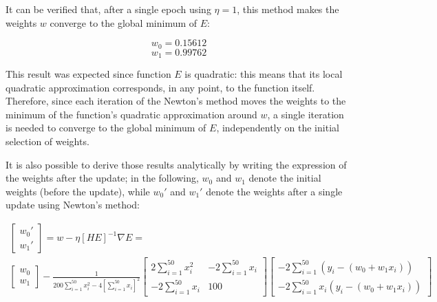 \documentclass[letterpaper,headings=standardclasses]{scrartcl}
\begin{document}
It can be verified that, after a single epoch using $\eta = 1$, this method makes the weights $w$ converge to the global minimum of $E$:

$$ w_0 = 0.15612 $$
$$ w_1 = 0.99762 $$

This result was expected since function $E$ is quadratic: this means that its local quadratic approximation corresponds, in any point, to the function itself. Therefore, since each iteration of the Newton's method moves the weights to the minimum of the function's quadratic approximation around $w$, a single iteration is needed to converge to the global minimum of $E$, independently on the initial selection of weights.

It is also possible to derive those results analytically by writing the expression of the weights after the update; in the following, $w_0$ and $w_1$ denote the initial weights (before the update), while $w_0'$ and $w_1'$ denote the weights after a single update using Newton's method:

\begin{multline*}
\left[ \begin{matrix} w_0' \\ w_1' \end{matrix} \right] = w - \eta [HE]^{-1} \nabla E = \\
\left[ \begin{matrix} w_0 \\ w_1 \end{matrix} \right] - \frac{1}{200 \sum_{i = 1}^{50} x_i^2 - 4 \left[ \sum_{i = 1}^{50} x_i \right]^2} \left[ \begin{matrix} 2 \sum_{i = 1}^{50} x_i^2 & -2 \sum_{i = 1}^{50} x_i \\[0.5em] -2 \sum_{i = 1}^{50} x_i & 100 \end{matrix} \right] \left[ \begin{matrix} -2 \sum_{i = 1}^{50} (y_i - (w_0 + w_1 x_i)) \\ -2 \sum_{i = 1}^{50} x_i (y_i - (w_0 + w_1 x_i)) \end{matrix} \right]
\end{multline*}
\end{document}
